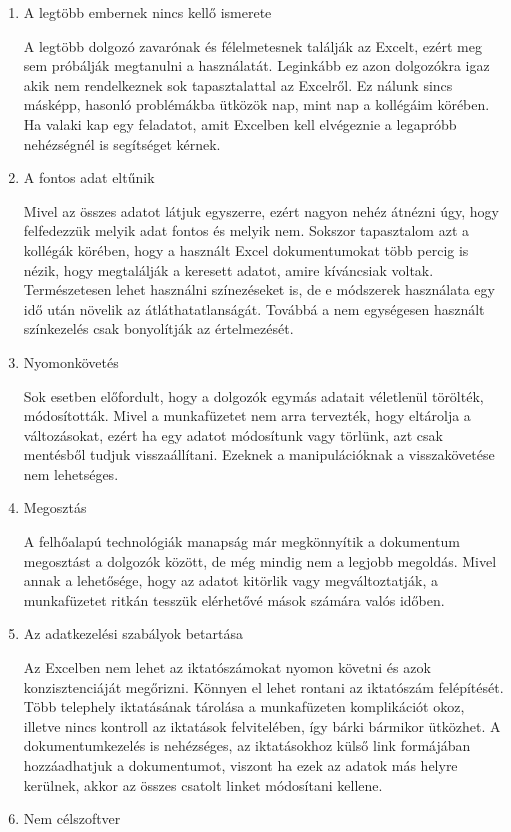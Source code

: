 \documentclass[
]{thesis-ekf}
\theoremstyle{definition}
\theoremstyle{remark}
\begin{document}
\begin{enumerate}[leftmargin=0pt]
	\item A legtöbb embernek nincs kellő ismerete
	
A legtöbb dolgozó zavarónak és félelmetesnek találják az Excelt, ezért meg sem próbálják megtanulni a használatát. Leginkább ez azon dolgozókra igaz akik nem rendelkeznek sok tapasztalattal az Excelről. Ez nálunk sincs másképp, hasonló problémákba ütközök nap, mint nap a kollégáim körében. Ha valaki kap egy feladatot, amit Excelben kell elvégeznie a legapróbb nehézségnél is segítséget kérnek.
   \item A fontos adat eltűnik
  
Mivel az összes adatot látjuk egyszerre, ezért nagyon nehéz átnézni úgy, hogy felfedezzük melyik adat fontos és melyik nem.\cite{excel} Sokszor tapasztalom azt a kollégák körében, hogy a használt Excel dokumentumokat több percig is nézik, hogy megtalálják a keresett adatot, amire kíváncsiak voltak. Természetesen lehet használni színezéseket is, de e módszerek használata egy idő után növelik az átláthatatlanságát.\cite{excel} Továbbá a nem egységesen használt színkezelés csak bonyolítják az értelmezését. 
	\item Nyomonkövetés
	
Sok esetben előfordult, hogy a dolgozók egymás adatait véletlenül törölték, módosították. Mivel a munkafüzetet nem arra tervezték, hogy eltárolja a változásokat, ezért ha egy adatot módosítunk vagy törlünk, azt csak mentésből tudjuk visszaállítani. Ezeknek a manipulációknak a visszakövetése nem lehetséges. 
	\item Megosztás
	
A felhőalapú technológiák manapság már megkönnyítik a dokumentum megosztást a dolgozók között, de még mindig nem a legjobb megoldás. Mivel annak a lehetősége, hogy az adatot kitörlik vagy megváltoztatják, a munkafüzetet ritkán tesszük elérhetővé mások számára valós időben. \cite{excel}
	\item Az adatkezelési szabályok betartása 
	
Az Excelben nem lehet az iktatószámokat nyomon követni és azok konzisztenciáját megőrizni. Könnyen el lehet rontani az iktatószám felépítését. Több telephely iktatásának tárolása a munkafüzeten komplikációt okoz, illetve nincs kontroll az iktatások felvitelében, így bárki bármikor ütközhet. A dokumentumkezelés is nehézséges, az iktatásokhoz külső link formájában hozzáadhatjuk a dokumentumot, viszont ha ezek az adatok más helyre kerülnek, akkor az összes csatolt linket módosítani kellene. 
	\item Nem célszoftver
	

\end{enumerate}
\end{document}
